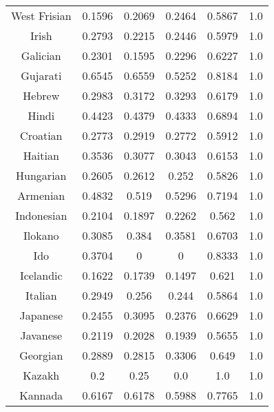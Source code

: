\begin{figure}[h]
\begin{tabular}{cccccc}
West Frisian&0.1596&0.2069&0.2464&0.5867&1.0\\
Irish&0.2793&0.2215&0.2446&0.5979&1.0\\
Galician&0.2301&0.1595&0.2296&0.6227&1.0\\
Gujarati&0.6545&0.6559&0.5252&0.8184&1.0\\
Hebrew&0.2983&0.3172&0.3293&0.6179&1.0\\
Hindi&0.4423&0.4379&0.4333&0.6894&1.0\\
Croatian&0.2773&0.2919&0.2772&0.5912&1.0\\
Haitian&0.3536&0.3077&0.3043&0.6153&1.0\\
Hungarian&0.2605&0.2612&0.252&0.5826&1.0\\
Armenian&0.4832&0.519&0.5296&0.7194&1.0\\
Indonesian&0.2104&0.1897&0.2262&0.562&1.0\\
Ilokano&0.3085&0.384&0.3581&0.6703&1.0\\
Ido&0.3704&0&0&0.8333&1.0\\
Icelandic&0.1622&0.1739&0.1497&0.621&1.0\\
Italian&0.2949&0.256&0.244&0.5864&1.0\\
Japanese&0.2455&0.3095&0.2376&0.6629&1.0\\
Javanese&0.2119&0.2028&0.1939&0.5655&1.0\\
Georgian&0.2889&0.2815&0.3306&0.649&1.0\\
Kazakh&0.2&0.25&0.0&1.0&1.0\\
Kannada&0.6167&0.6178&0.5988&0.7765&1.0\\
\end{tabular}
\end{figure}
\clearpage
